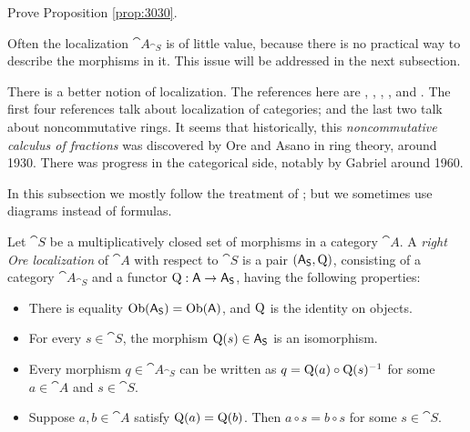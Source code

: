 \begin{exer} \label{exer:3031}
Prove Proposition \ref{prop:3030}. 
\end{exer}

Often the localization $\cat{A}_{\cat{S}}$ is of little value, because there is 
no practical way to describe the morphisms in it. This issue will be addressed 
in the next subsection. 




There is a better notion of localization. 
The references here are \cite{RD}, \cite{GaZi}, \cite{We}, \cite{KaSc1}, 
\cite{Ste} and \cite{Row}. The first four references talk about localization of 
categories; and the last two talk about noncommutative rings. 
It seems that historically, this {\em noncommutative calculus of fractions} was 
discovered by Ore and Asano in ring theory, around 1930. There was progress in 
the categorical side, notably by Gabriel around 1960. 

In this subsection we mostly follow the treatment of \cite{Ste}; but we 
sometimes use diagrams instead of formulas.

\begin{dfn}  \label{dfn:1407}
Let $\cat{S}$ be a multiplicatively closed set of morphisms in a category 
$\cat{A}$. A {\em right Ore localization}
of $\cat{A}$ with respect to 
$\cat{S}$ is a pair $(\operatorname{\mathsf{A}}_{\operatorname{\mathsf{S}}}, \operatorname{Q})$, consisting of a category 
$\cat{A}_{\cat{S}}$ and a functor 
$\operatorname{Q} : \operatorname{\mathsf{A}} \to \operatorname{\mathsf{A}}_{\operatorname{\mathsf{S}}}$, having the following 
properties:
\begin{itemize}[leftmargin=30pt] 
\item[(RO1)] There is equality 
$\operatorname{Ob}(\operatorname{\mathsf{A}}_{\operatorname{\mathsf{S}}}) = \operatorname{Ob}(\operatorname{\mathsf{A}})$, and $\operatorname{Q}$ is the 
identity on
objects.

\item[(RO2)]  For every $s \in \cat{S}$, the morphism $\operatorname{Q}(s) \in
\operatorname{\mathsf{A}}_{\operatorname{\mathsf{S}}}$
is an isomorphism. 

\item[(RO3)]  Every morphism $q \in \cat{A}_{\cat{S}}$ can be written as
$q = \operatorname{Q}(a) \circ \operatorname{Q}(s)^{-1}$ for some 
$a \in \cat{A}$ and $s \in \cat{S}$.

\item[(RO4)]  Suppose $a, b \in \cat{A}$ satisfy 
$\operatorname{Q}(a) = \operatorname{Q}(b)$. Then $a \circ s = b \circ s$ for some 
$s \in \cat{S}$. 
\end{itemize}
\end{dfn}

